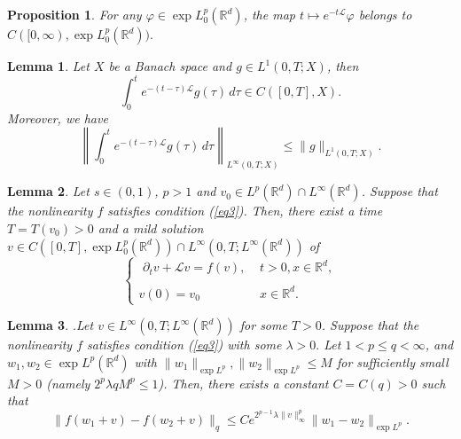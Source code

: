 \documentclass[10pt,a4paper]{amsart}
\newtheorem{proposition}{Proposition}
\newtheorem{lemma}{Lemma}
\begin{document}
\begin{proposition}\label{prop2}
For any $\varphi\in \exp L^p_0(\mathbb{R}^d)$, the map $t\mapsto e^{-t\mathcal{L}}\varphi$ belongs to $C([0,\infty),\exp L^p_0(\mathbb{R}^d)).$
\end{proposition}

\begin{lemma}\label{lemma10}
Let $X$ be a Banach space and $ g\in L^1(0,T;X)$, then $$\displaystyle \int_0^te^{-(t-\tau)\mathcal{L}}g(\tau)\,d\tau\in C([0,T],X).$$ Moreover, we have
$$\left\|\int_0^te^{-(t-\tau)\mathcal{L}}g(\tau)\,d\tau\right\|_{L^\infty(0,T;X)}\leq \|g\|_{L^1(0,T;X)}.$$
\end{lemma}

\begin{lemma}${}$\label{lemma7} 
Let $s\in(0,1)$, $p>1$ and $v_0\in L^p(\mathbb{R}^d)\cap L^\infty(\mathbb{R}^d)$. Suppose that the nonlinearity $f$ satisfies condition \emph{(\ref{eq3})}. Then, there exist a time $T=T(v_0)>0$ and a mild solution $v\in C([0,T],\exp L^p_0(\mathbb{R}^d))\cap L^\infty(0,T;L^\infty(\mathbb{R}^d))$ of 
\begin{equation}\label{eq24}
\left\{\begin{array}{ll}
\,\, \displaystyle {\partial_t v+\mathcal{L}v =f(v),} &\displaystyle {t>0,x\in {\mathbb{R}^d},}\\
{}\\
\displaystyle{v(0)=  v_0 \qquad\qquad}&\displaystyle{x\in {\mathbb{R}^d}}.
\end{array}
\right.
\end{equation} 
 \end{lemma}

\begin{lemma}\cite[Lemma 4.4]{Majdoub2}.\label{lemma9}
Let $v\in L^\infty(0,T;L^\infty(\mathbb{R}^d))$ for some $T>0$. Suppose that the nonlinearity $f$ satisfies condition \emph{(\ref{eq3})} with some $\lambda>0.$ Let $1<p\leq q<\infty$, and $w_1,w_2\in \exp L^p(\mathbb{R}^d)$ with $\|w_1\|_{\exp L^p},\|w_2\|_{\exp L^p}\leq M$ for sufficiently small $M>0$ (namely $2^p\lambda q M^p\leq1$). Then, there exists a constant $C=C(q)>0$ such that 
$$\|f(w_1+v)-f(w_2+v)\|_q\leq Ce^{2^{p-1}\lambda\|v\|_\infty^p}\|w_1-w_2\|_{\exp L^p}.$$
 \end{lemma}
\end{document}

